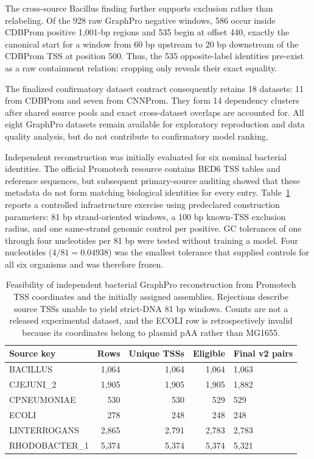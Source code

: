 The cross-source Bacillus finding further supports exclusion rather than
relabeling. Of the 928 raw GraphPro negative windows, 586 occur inside CDBProm
positive 1,001-bp regions and 535 begin at offset 440, exactly the canonical
start for a window from 60 bp upstream to 20 bp downstream of the CDBProm TSS at
position 500. Thus, the 535 opposite-label identities pre-exist as a raw
containment relation; cropping only reveals their exact equality.

The finalized confirmatory dataset contract consequently retains 18 datasets:
11 from CDBProm and seven from CNNProm. They form 14 dependency clusters after
shared source pools and exact cross-dataset overlaps are accounted for. All
eight GraphPro datasets remain available for exploratory reproduction and data
quality analysis, but do not contribute to confirmatory model ranking.

Independent reconstruction was initially evaluated for six nominal bacterial
identities. The official Promotech resource contains BED6 TSS tables and
reference sequences, but subsequent primary-source auditing showed that these
metadata do not form matching biological identities for every entry.
Table~\ref{tab:results-graphpro-reconstruction-feasibility} reports a
controlled infrastructure exercise using
predeclared construction parameters: 81 bp strand-oriented windows, a 100 bp
known-TSS exclusion radius, and one same-strand genomic control per positive.
GC tolerances of one through four nucleotides per 81 bp were tested without
training a model. Four nucleotides ($4/81=0.04938$) was the smallest tolerance
that supplied controls for all six organisms and was therefore frozen.

\begin{table}[htbp]
  \centering
  \caption{Feasibility of independent bacterial GraphPro reconstruction from
  Promotech TSS coordinates and the initially assigned assemblies. Rejections describe source
  TSSs unable to yield strict-DNA 81 bp windows. Counts are not a released
  experimental dataset, and the ECOLI row is retrospectively invalid because
  its coordinates belong to plasmid pAA rather than MG1655.}
  \label{tab:results-graphpro-reconstruction-feasibility}
  \begin{tabular}{lrrrl}
    \toprule
    Source key & Rows & Unique TSSs & Eligible & Final v2 pairs \\
    \midrule
    BACILLUS & 1,064 & 1,064 & 1,064 & 1,063 \\
    CJEJUNI\_2 & 1,905 & 1,905 & 1,905 & 1,882 \\
    CPNEUMONIAE & 530 & 530 & 529 & 529 \\
    ECOLI & 278 & 248 & 248 & 248 \\
    LINTERROGANS & 2,865 & 2,791 & 2,783 & 2,783 \\
    RHODOBACTER\_1 & 5,374 & 5,374 & 5,374 & 5,321 \\
    \bottomrule
  \end{tabular}
\end{table}

